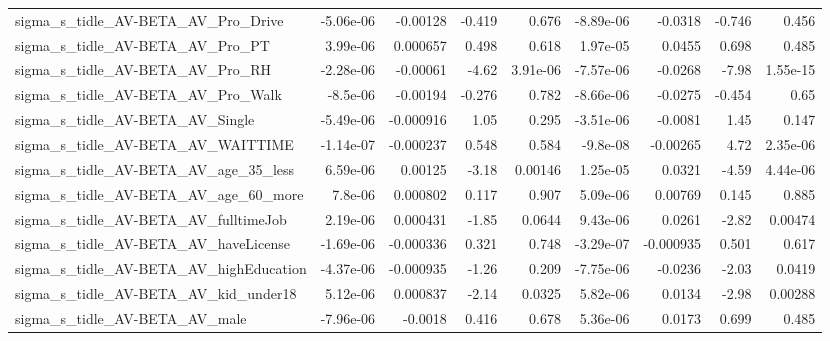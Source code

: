 \begin{tabular}{lrrrrrrrr}
sigma\_s\_tidle\_AV-BETA\_AV\_Pro\_Drive                 &   -5.06e-06 &     -0.00128 &    -0.419 &    0.676 &  -8.89e-06 &     -0.0318 &       -0.746 &         0.456 \\
sigma\_s\_tidle\_AV-BETA\_AV\_Pro\_PT                    &    3.99e-06 &     0.000657 &     0.498 &    0.618 &   1.97e-05 &      0.0455 &        0.698 &         0.485 \\
sigma\_s\_tidle\_AV-BETA\_AV\_Pro\_RH                    &   -2.28e-06 &     -0.00061 &     -4.62 & 3.91e-06 &  -7.57e-06 &     -0.0268 &        -7.98 &      1.55e-15 \\
sigma\_s\_tidle\_AV-BETA\_AV\_Pro\_Walk                  &    -8.5e-06 &     -0.00194 &    -0.276 &    0.782 &  -8.66e-06 &     -0.0275 &       -0.454 &          0.65 \\
sigma\_s\_tidle\_AV-BETA\_AV\_Single                    &   -5.49e-06 &    -0.000916 &      1.05 &    0.295 &  -3.51e-06 &     -0.0081 &         1.45 &         0.147 \\
sigma\_s\_tidle\_AV-BETA\_AV\_WAITTIME                  &   -1.14e-07 &    -0.000237 &     0.548 &    0.584 &   -9.8e-08 &    -0.00265 &         4.72 &      2.35e-06 \\
sigma\_s\_tidle\_AV-BETA\_AV\_age\_35\_less               &    6.59e-06 &      0.00125 &     -3.18 &  0.00146 &   1.25e-05 &      0.0321 &        -4.59 &      4.44e-06 \\
sigma\_s\_tidle\_AV-BETA\_AV\_age\_60\_more               &     7.8e-06 &     0.000802 &     0.117 &    0.907 &   5.09e-06 &     0.00769 &        0.145 &         0.885 \\
sigma\_s\_tidle\_AV-BETA\_AV\_fulltimeJob               &    2.19e-06 &     0.000431 &     -1.85 &   0.0644 &   9.43e-06 &      0.0261 &        -2.82 &       0.00474 \\
sigma\_s\_tidle\_AV-BETA\_AV\_haveLicense               &   -1.69e-06 &    -0.000336 &     0.321 &    0.748 &  -3.29e-07 &   -0.000935 &        0.501 &         0.617 \\
sigma\_s\_tidle\_AV-BETA\_AV\_highEducation             &   -4.37e-06 &    -0.000935 &     -1.26 &    0.209 &  -7.75e-06 &     -0.0236 &        -2.03 &        0.0419 \\
sigma\_s\_tidle\_AV-BETA\_AV\_kid\_under18               &    5.12e-06 &     0.000837 &     -2.14 &   0.0325 &   5.82e-06 &      0.0134 &        -2.98 &       0.00288 \\
sigma\_s\_tidle\_AV-BETA\_AV\_male                      &   -7.96e-06 &      -0.0018 &     0.416 &    0.678 &   5.36e-06 &      0.0173 &        0.699 &         0.485 \\

\end{tabular}
